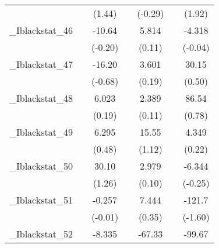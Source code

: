 {\begin{tabular}{l*{6}{c}}
            &                     &      (1.44)         &                     &     (-0.29)         &                     &      (1.92)         \\
[1em]
\_Iblackstat\_46&                     &      -10.64         &                     &       5.814         &                     &      -4.318         \\
            &                     &     (-0.20)         &                     &      (0.11)         &                     &     (-0.04)         \\
[1em]
\_Iblackstat\_47&                     &      -16.20         &                     &       3.601         &                     &       30.15         \\
            &                     &     (-0.68)         &                     &      (0.19)         &                     &      (0.50)         \\
[1em]
\_Iblackstat\_48&                     &       6.023         &                     &       2.389         &                     &       86.54         \\
            &                     &      (0.19)         &                     &      (0.11)         &                     &      (0.78)         \\
[1em]
\_Iblackstat\_49&                     &       6.295         &                     &       15.55         &                     &       4.349         \\
            &                     &      (0.48)         &                     &      (1.12)         &                     &      (0.22)         \\
[1em]
\_Iblackstat\_50&                     &       30.10         &                     &       2.979         &                     &      -6.344         \\
            &                     &      (1.26)         &                     &      (0.10)         &                     &     (-0.25)         \\
[1em]
\_Iblackstat\_51&                     &      -0.257         &                     &       7.444         &                     &      -121.7         \\
            &                     &     (-0.01)         &                     &      (0.35)         &                     &     (-1.60)         \\
[1em]
\_Iblackstat\_52&                     &      -8.335         &                     &      -67.33         &                     &      -99.67         \\

\end{tabular}}
